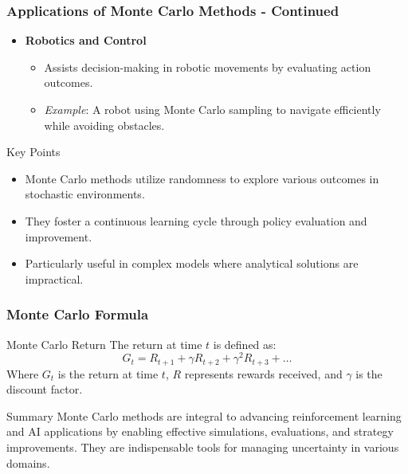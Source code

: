 \documentclass[aspectratio=169]{beamer}
\begin{document}
\begin{frame}[fragile]
    \frametitle{Applications of Monte Carlo Methods - Continued}
    \begin{itemize}
        \item \textbf{Robotics and Control}
            \begin{itemize}
                \item Assists decision-making in robotic movements by evaluating action outcomes.
                \item \textit{Example}: A robot using Monte Carlo sampling to navigate efficiently while avoiding obstacles.
            \end{itemize}
    \end{itemize}

    \begin{block}{Key Points}
        \begin{itemize}
            \item Monte Carlo methods utilize randomness to explore various outcomes in stochastic environments.
            \item They foster a continuous learning cycle through policy evaluation and improvement.
            \item Particularly useful in complex models where analytical solutions are impractical.
        \end{itemize}
    \end{block}
\end{frame}

\begin{frame}[fragile]
    \frametitle{Monte Carlo Formula}
    \begin{block}{Monte Carlo Return}
        The return at time \( t \) is defined as:
        \begin{equation}
            G_t = R_{t+1} + \gamma R_{t+2} + \gamma^2 R_{t+3} + \ldots
        \end{equation}
        Where \( G_t \) is the return at time \( t \), \( R \) represents rewards received, and \( \gamma \) is the discount factor.
    \end{block}
    
    \begin{block}{Summary}
        Monte Carlo methods are integral to advancing reinforcement learning and AI applications by enabling effective simulations, evaluations, and strategy improvements. They are indispensable tools for managing uncertainty in various domains.
    \end{block}
\end{frame}
\end{document}
